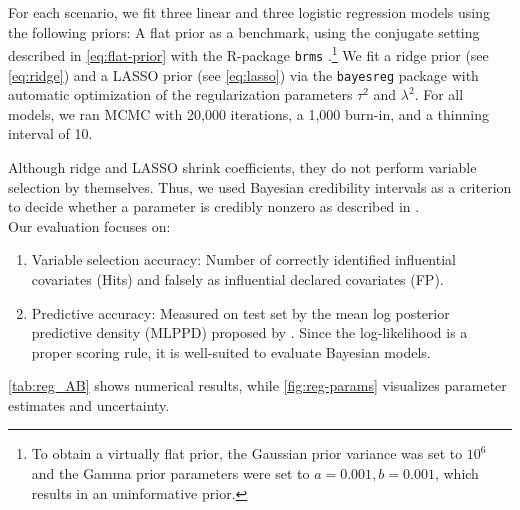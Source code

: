 For each scenario, we fit three linear and three logistic regression models using the following priors: A flat prior as a benchmark, using the conjugate setting described in \autoref{eq:flat-prior} with the R-package \texttt{brms} \citep{brms_2017}.\footnote{To obtain a virtually flat prior, the Gaussian prior variance was set to $10^6$ and the Gamma prior parameters were set to $a = 0.001, b=0.001$, which results in an uninformative prior.} 
We fit a ridge prior (see \autoref{eq:ridge}) and a LASSO prior (see \autoref{eq:lasso}) via the \texttt{bayesreg} package \citep{makalic_bayesreg_2016} with automatic optimization of the regularization parameters $\tau^2$ and $\lambda^2$.
For all models, we ran MCMC with 20,000 iterations, a 1,000 burn-in, and a thinning interval of 10.

Although ridge and LASSO shrink coefficients, they do not perform variable selection by themselves.
Thus, we used Bayesian credibility intervals as a criterion to decide whether a parameter is credibly nonzero as described in \citet{van_erp_shrinkage_2019}.\\

Our evaluation focuses on:
\begin{enumerate}
    \item Variable selection accuracy: Number of correctly identified influential covariates (Hits) and falsely as influential declared covariates (FP).
    \item Predictive accuracy: Measured on test set by the mean log posterior predictive density (MLPPD) proposed by \citet{gelman_understanding_2013}.
    Since the log-likelihood is a proper scoring rule, it is well-suited to evaluate Bayesian models.
\end{enumerate}

\autoref{tab:reg_AB} shows numerical results, while \autoref{fig:reg-params} visualizes parameter estimates and uncertainty.

